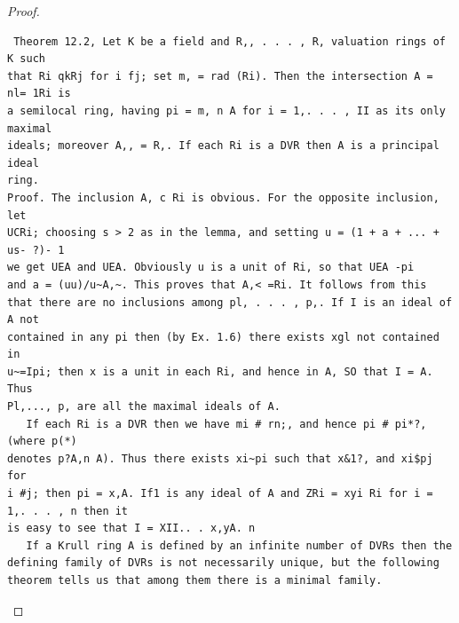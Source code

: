 \begin{proof}
\begin{verbatim}
 Theorem 12.2, Let K be a field and R,, . . . , R, valuation rings of K such
that Ri qkRj for i fj; set m, = rad (Ri). Then the intersection A = nl= 1Ri is
a semilocal ring, having pi = m, n A for i = 1,. . . , II as its only maximal
ideals; moreover A,, = R,. If each Ri is a DVR then A is a principal ideal
ring.
Proof. The inclusion A, c Ri is obvious. For the opposite inclusion, let
UCRi; choosing s > 2 as in the lemma, and setting u = (1 + a + ... + us- ?)- 1
we get UEA and UEA. Obviously u is a unit of Ri, so that UEA -pi
and a = (uu)/u~A,~. This proves that A,< =Ri. It follows from this
that there are no inclusions among pl, . . . , p,. If I is an ideal of A not
contained in any pi then (by Ex. 1.6) there exists xgl not contained in
u~=Ipi; then x is a unit in each Ri, and hence in A, SO that I = A. Thus
Pl,..., p, are all the maximal ideals of A.
   If each Ri is a DVR then we have mi # rn;, and hence pi # pi*?, (where p(*)
denotes p?A,n A). Thus there exists xi~pi such that x&1?, and xi$pj for
i #j; then pi = x,A. If1 is any ideal of A and ZRi = xyi Ri for i = 1,. . . , n then it
is easy to see that I = XII.. . x,yA. n
   If a Krull ring A is defined by an infinite number of DVRs then the
defining family of DVRs is not necessarily unique, but the following
theorem tells us that among them there is a minimal family.
\end{verbatim}
\end{proof}


